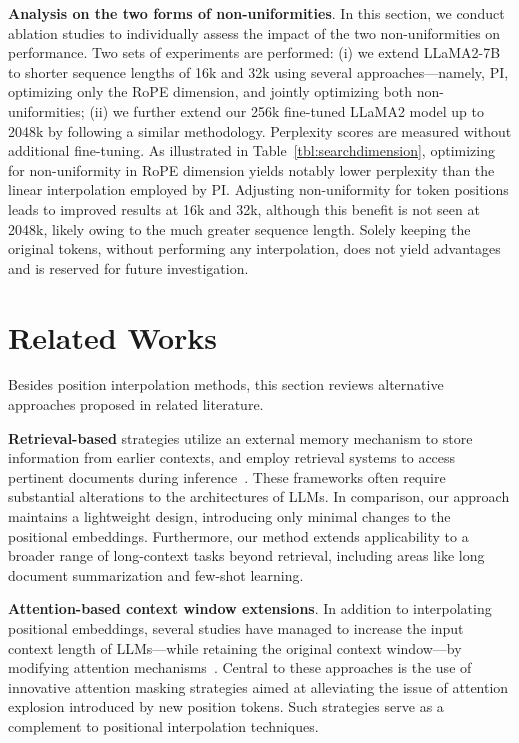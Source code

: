 \textbf{Analysis on the two forms of non-uniformities}. In this section, we conduct ablation studies to individually assess the impact of the two non-uniformities on performance. Two sets of experiments are performed: (i) we extend LLaMA2-7B to shorter sequence lengths of 16k and 32k using several approaches—namely, PI, optimizing only the RoPE dimension, and jointly optimizing both non-uniformities; (ii) we further extend our 256k fine-tuned LLaMA2 model up to 2048k by following a similar methodology. Perplexity scores are measured without additional fine-tuning. As illustrated in Table~\ref{tbl:searchdimension}, optimizing for non-uniformity in RoPE dimension yields notably lower perplexity than the linear interpolation employed by PI. Adjusting non-uniformity for token positions leads to improved results at 16k and 32k, although this benefit is not seen at 2048k, likely owing to the much greater sequence length. Solely keeping the original tokens, without performing any interpolation, does not yield advantages and is reserved for future investigation.

\section{Related Works}

Besides position interpolation methods, this section reviews alternative approaches proposed in related literature.

\textbf{Retrieval-based} strategies utilize an external memory mechanism to store information from earlier contexts, and employ retrieval systems to access pertinent documents during inference~\cite{longllama,wang2023augmenting,borgeaud2022improving}. These frameworks often require substantial alterations to the architectures of LLMs. In comparison, our approach maintains a lightweight design, introducing only minimal changes to the positional embeddings. Furthermore, our method extends applicability to a broader range of long-context tasks beyond retrieval, including areas like long document summarization and few-shot learning.

\textbf{Attention-based context window extensions}. In addition to interpolating positional embeddings, several studies have managed to increase the input context length of LLMs—while retaining the original context window—by modifying attention mechanisms~\cite{han2023lminfinite, streamingllm,parallelwindow}. Central to these approaches is the use of innovative attention masking strategies aimed at alleviating the issue of attention explosion introduced by new position tokens. Such strategies serve as a complement to positional interpolation techniques.

